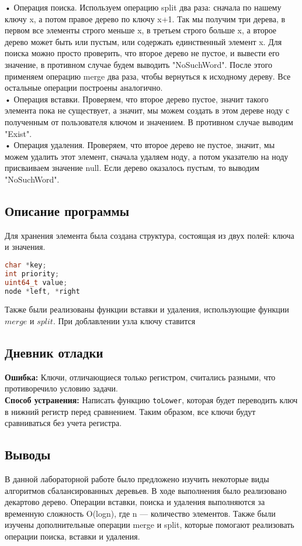\documentclass[12pt]{article}
\begin{document}
• Операция поиска. Используем операцию split два раза: сначала по нашему ключу
x, а потом правое дерево по ключу x+1. Так мы получим три дерева, в первом все
элементы строго меньше x, в третьем строго больше x, а второе дерево может быть
или пустым, или содержать единственный элемент x. Для поиска можно просто
проверить, что второе дерево не пустое, и вывести его значение, в противном
случае будем выводить "NoSuchWord". После этого применяем операцию merge
два раза, чтобы вернуться к исходному дереву. Все остальные операции построены
аналогично. \\
• Операция вставки. Проверяем, что второе дерево пустое, значит такого элемента
пока не существует, а значит, мы можем создать в этом дереве ноду с полученным
от пользователя ключом и значением. В противном случае выводим "Exist".\\
• Операция удаления. Проверяем, что второе дерево не пустое, значит, мы можем
удалить этот элемент, сначала удаляем ноду, а потом указателю на ноду присваиваем
значение null. Если дерево оказалось пустым, то выводим "NoSuchWord".\\


\subsection*{Описание программы}

Для хранения элемента была создана структура, состоящая из двух полей: ключа и значения.

\begin{lstlisting}[language=C++]
char *key;
int priority;
uint64_t value;
node *left, *right
\end{lstlisting}

Также были реализованы функции вставки и удаления, использующие функции $merge$ и $split$.
При доблавлении узла ключу ставится 


\subsection*{Дневник отладки}

\textbf{Ошибка:} Ключи, отличающиеся только регистром, считались разными, что противоречило условию задачи. \\


\textbf{Способ устранения:} Написать функцию \texttt{toLower}, которая будет переводить ключ в нижний регистр перед сравнением. Таким образом, все ключи будут сравниваться без учета регистра.


\subsection*{Выводы}

В данной лабораторной работе было предложено изучить некоторые виды алгоритмов
сбалансированных деревьев. В ходе выполнения было реализовано декартово дерево. Операции
вставки, поиска и удаления выполняются за временную сложность O(logn), где n —
количество элементов. Также были изучены дополнительные операции merge и
split, которые помогают реализовать операции поиска, вставки и удаления.
\end{document}
